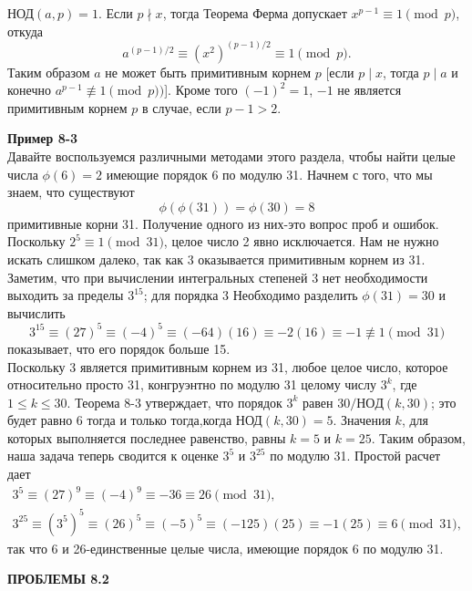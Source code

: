 \documentclass[11pt]{article}
\begin{document}
\noindent $\text{НОД}(a,p)=1.$ Если $p \nmid x$, тогда Теорема Ферма допускает $x^{p-1} \equiv 1 \pmod{p}$, откуда
\begin{equation*}
    a^{{(p-1)}/2} \equiv (x^2)^{(p-1)/2} \equiv 1 \pmod{p}.
\end{equation*}
Таким образом $a$ не может быть примитивным корнем $p$ [если $p \mid x$, тогда $p \mid a$ и конечно $a^{p-1} \not\equiv 1 \pmod{p})$]. Кроме того $(-1)^2=1$, $-1$ не является примитивным корнем $p$ в случае, если $p-1>2$. 

\noindent \textbf{Пример 8-3} \\
Давайте воспользуемся различными методами этого раздела, чтобы найти целые числа $\phi(6)=2$ имеющие порядок 6 по модулю 31. Начнем с того, что мы знаем, что существуют
\begin{equation*}
    \phi(\phi(31))=\phi(30)=8
\end{equation*}
примитивные корни 31. Получение одного из них-это вопрос проб и ошибок. Поскольку $2^5 \equiv 1 \pmod{31}$, целое число 2 явно исключается. Нам не нужно искать слишком далеко, так как 3 оказывается примитивным корнем из 31. Заметим, что при вычислении интегральных степеней 3 нет необходимости выходить за пределы $3^{15}$; для порядка 3 Необходимо разделить $\phi(31)=30$ и вычислить
\begin{equation*}
    3^{15} \equiv (27)^5 \equiv (-4)^5 \equiv (-64)(16) \equiv -2(16) \equiv -1 \not\equiv 1 \pmod{31}
\end{equation*}
показывает, что его порядок больше 15. \\
Поскольку 3 является примитивным корнем из 31, любое целое число, которое относительно просто 31, конгруэнтно по модулю 31 целому числу $3^k$, где $1 \leqslant k \leqslant 30$. Теорема 8-3 утверждает, что порядок $3^k$ равен $30/НОД(k,30)$; это будет равно 6 тогда и только тогда,когда $\text{НОД} (k, 30)=5$. Значения $k$, для которых выполняется последнее равенство, равны $k=5$ и $k=25$. Таким образом, наша задача теперь сводится к оценке $3^5$ и $3^{25}$ по модулю 31. Простой расчет дает
\begin{gather*}
    3^5 \equiv (27)^9 \equiv (-4)^9 \equiv -36 \equiv 26 \pmod{31}, \\
    3^{25} \equiv (3^5)^5 \equiv (26)^5 \equiv (-5)^5 \equiv (-125)(25) \equiv -1(25) \equiv 6 \pmod{31},
\end{gather*}
так что 6 и 26-единственные целые числа, имеющие порядок 6 по модулю 31. \\
\begin{center}
    {\bf ПРОБЛЕМЫ 8.2}
\end{center}
\end{document}
